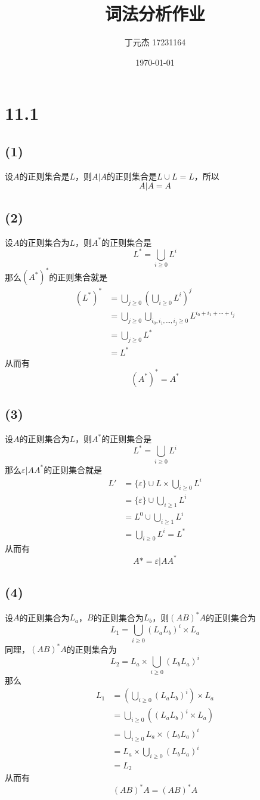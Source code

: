 \documentclass[UTF8]{ctexart}
\title{词法分析作业}
\author{丁元杰 17231164}
\date{\today}
\begin{document}
\maketitle

\section*{11.1}
\subsection*{(1)}
设$A$的正则集合是$L$，则$A\big| A$的正则集合是$L\cup L=L$，所以
$$A\big| A = A$$

\subsection*{(2)}
设$A$的正则集合为$L$，则$A^*$的正则集合是
$$L^*=\bigcup_{i\geq 0}{L^i}$$
那么$(A^*)^*$的正则集合就是
\begin{align*}
    (L^*)^*
    &=\bigcup_{j\geq 0}{\left(\bigcup_{i\geq 0}{L^i}\right)^j}\\
    &=\bigcup_{j\geq 0}{\bigcup_{i_0, i_1, \dots, i_j\geq 0}{L^{i_0+i_1+\cdots+i_j}}}\\
    &=\bigcup_{j\geq 0}{L^*}\\
    &=L^*
\end{align*}
从而有
$$(A^*)^*=A^*$$

\subsection*{(3)}
设$A$的正则集合为$L$，则$A^*$的正则集合是
$$L^*=\bigcup_{i\geq 0}{L^i}$$
那么$\varepsilon\big|AA^*$的正则集合就是
\begin{align*}
    L'
    &=\{\varepsilon\}\cup L\times\bigcup_{i\geq 0}{L^i}\\
    &=\{\varepsilon\}\cup\bigcup_{i\geq 1}{L^i}\\
    &=L^0\cup\bigcup_{i\geq 1}{L^i}\\
    &=\bigcup_{i\geq 0}{L^i} = L^*
\end{align*}
从而有
$$A*=\varepsilon\big|AA^*$$

\subsection*{(4)}
设$A$的正则集合为$L_a$，$B$的正则集合为$L_b$，则$(AB)^*A$的正则集合为
$$L_1=\bigcup_{i\geq 0}{(L_aL_b)^i}\times L_a$$
同理，$(AB)^*A$的正则集合为
$$L_2=L_a\times \bigcup_{i\geq 0}{(L_bL_a)^i}$$
那么
\begin{align*}
    L_1
    &=\left(\bigcup_{i\geq 0}{(L_aL_b)^i}\right)\times L_a\\
    &=\bigcup_{i\geq 0}{\left((L_aL_b)^i\times L_a\right)}\\
    &=\bigcup_{i\geq 0}{L_a\times (L_bL_a)^i}\\
    &=L_a\times \bigcup_{i\geq 0}{(L_bL_a)^i}\\
    &=L_2
\end{align*}
从而有
$$(AB)^*A=(AB)^*A$$
\end{document}
